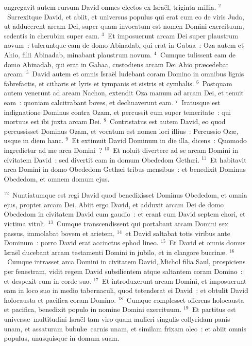 \bchapter
{}ongregavit autem rursum David omnes electos ex Isra\"el, triginta millia.
${}^{2}$~Surrexitque David, et abiit, et universus populus qui erat cum eo de viris Juda, ut adducerent arcam Dei, super quam invocatum est nomen Domini exercituum, sedentis in cherubim super eam.
${}^{3}$~Et imposuerunt arcam Dei super plaustrum novum~: tuleruntque eam de domo Abinadab, qui erat in Gabaa~: Oza autem et Ahio, filii Abinadab, minabant plaustrum novum.
${}^{4}$~Cumque tulissent eam de domo Abinadab, qui erat in Gabaa, custodiens arcam Dei Ahio pr\ae cedebat arcam.
${}^{5}$~David autem et omnis Isra\"el ludebant coram Domino in omnibus lignis fabrefactis, et citharis et lyris et tympanis et sistris et cymbalis.
${}^{6}$~Postquam autem venerunt ad aream Nachon, extendit Oza manum ad arcam Dei, et tenuit eam~: quoniam calcitrabant boves, et declinaverunt eam.
${}^{7}$~Iratusque est indignatione Dominus contra Ozam, et percussit eum super temeritate~: qui mortuus est ibi juxta arcam Dei.
${}^{8}$~Contristatus est autem David, eo quod percussisset Dominus Ozam, et vocatum est nomen loci illius~: Percussio Oz\ae , usque in diem hanc.
${}^{9}$~Et extimuit David Dominum in die illa, dicens~: Quomodo ingredietur ad me arca Domini~?
${}^{10}$~Et noluit divertere ad se arcam Domini in civitatem David~: sed divertit eam in domum Obededom Geth\ae i.
${}^{11}$~Et habitavit arca Domini in domo Obededom Geth\ae i tribus mensibus~: et benedixit Dominus Obededom, et omnem domum ejus.


${}^{12}$~Nuntiatumque est regi David quod benedixisset Dominus Obededom, et omnia ejus, propter arcam Dei. Abiit ergo David, et adduxit arcam Dei de domo Obededom in civitatem David cum gaudio~: et erant cum David septem chori, et victima vituli.
${}^{13}$~Cumque transcendissent qui portabant arcam Domini sex passus, immolabat bovem et arietem,
${}^{14}$~et David saltabat totis viribus ante Dominum~: porro David erat accinctus ephod lineo.
${}^{15}$~Et David et omnis domus Isra\"el ducebant arcam testamenti Domini in jubilo, et in clangore buccin\ae .
${}^{16}$~Cumque intrasset arca Domini in civitatem David, Michol filia Saul, prospiciens per fenestram, vidit regem David subsilientem atque saltantem coram Domino~: et despexit eum in corde suo.
${}^{17}$~Et introduxerunt arcam Domini, et imposuerunt eam in loco suo in medio tabernaculi, quod tetenderat ei David~: et obtulit David holocausta et pacifica coram Domino.
${}^{18}$~Cumque complesset offerens holocausta et pacifica, benedixit populo in nomine Domini exercituum.
${}^{19}$~Et partitus est univers\ae\ multitudini Isra\"el tam viro quam mulieri singulis collyridam panis unam, et assaturam bubul\ae\ carnis unam, et similam frixam oleo~: et abiit omnis populus, unusquisque in domum suam.


